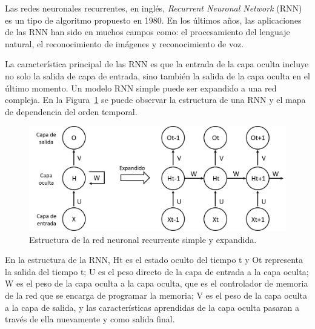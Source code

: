  Las redes neuronales recurrentes, en inglés, \textit{Recurrent Neuronal Network} (RNN) es un tipo de algoritmo propuesto en 1980. En los últimos años, las aplicaciones de las RNN han sido en muchos campos como: el procesamiento del lenguaje natural, el reconocimiento de imágenes y reconocimiento de voz.

 La característica principal de las RNN es que la entrada de la capa oculta incluye no solo la salida de capa de entrada, sino también la salida de la capa oculta en el último momento. Un modelo RNN simple puede ser expandido a una red compleja. En la Figura~\ref{fig:RNN} se puede observar la estructura de una RNN y el mapa de dependencia del orden temporal.

   \begin{figure}[!h]
     \centering
     \includegraphics[width=.7\textwidth]{Imagenes/RNN.png}
     \caption{Estructura de la red neuronal recurrente simple y expandida.}
     \label{fig:RNN}
 \end{figure}

En la estructura de la RNN, Ht es el estado oculto del tiempo t y Ot representa la salida del tiempo t; U es el peso directo de la capa de entrada a la capa oculta; W es el peso de la capa oculta a la capa oculta, que es el controlador de memoria de la red que se encarga de programar la memoria; V es el peso de la capa oculta a la capa de salida, y las características aprendidas de la capa oculta pasaran a través de ella nuevamente y como salida final.

